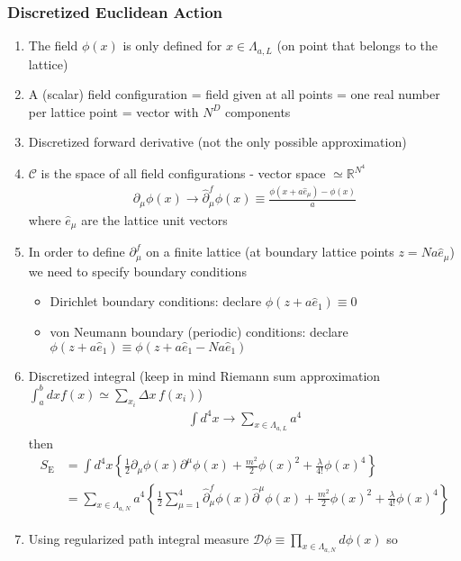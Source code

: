 \documentclass[10pt,a4paper]{article}
\theoremstyle{definition}
\begin{document}
\subsubsection*{Discretized Euclidean Action}
\begin{enumerate}[(1)]
\item The field $\phi(x)$ is only defined for $x\in \Lambda_{a,L}$ (on point that belongs to the lattice)
\item A (scalar) field configuration = field given at all points = one real number per lattice point = vector with $N^D$ components
\item Discretized forward derivative (not the only possible approximation)
\item $\mathcal{C}$ is the space of all field configurations - vector space $\simeq\mathbb{R}^{N^4}$
\begin{align}
\partial_\mu\phi(x)\rightarrow\hat{\partial}^f_\mu\phi(x)\equiv\frac{\phi(x+a\hat{e}_\mu)-\phi(x)}{a}
\end{align}
where $\hat{e}_\mu$ are the lattice unit vectors
\item In order to define $\partial^f_\mu$ on a finite lattice (at boundary lattice points $z=Na\hat{e}_\mu$) we need to specify boundary conditions
\begin{itemize}
\item Dirichlet boundary conditions: declare $\phi(z+a\hat{e}_1)\equiv0$
\item von Neumann boundary (periodic) conditions: declare $\phi(z+a\hat{e}_1)\equiv\phi(z+a\hat{e}_1-Na\hat{e}_1)$
\end{itemize}
\item Discretized integral (keep in mind Riemann sum approximation $\int_a^b dx f(x)\simeq\sum_{x_i}\Delta x\,f(x_i)$)
\begin{align}
\int d^4x\rightarrow\sum_{x\in\Lambda_{a,L}}a^4
\end{align}
then
\begin{align}
S_\text{E}
&=\int d^4x\left\{\frac{1}{2}\partial_\mu\phi(x)\partial^\mu\phi(x)+\frac{m^2}{2}\phi(x)^2+\frac{\lambda}{4!}\phi(x)^4\right\}\\
&=\sum_{x\in\Lambda_{a,N}}a^4\left\{\frac{1}{2}\sum_{\mu=1}^4\hat\partial^f_\mu\phi(x)\hat\partial^\mu\phi(x)+\frac{m^2}{2}\phi(x)^2+\frac{\lambda}{4!}\phi(x)^4\right\}
\end{align}
\item Using regularized path integral measure $\mathcal{D}\phi\equiv\prod_{x\in \Lambda_{a,N}}d\phi(x)$ so
\begin{align}

\end{align}
\end{enumerate}
\end{document}
